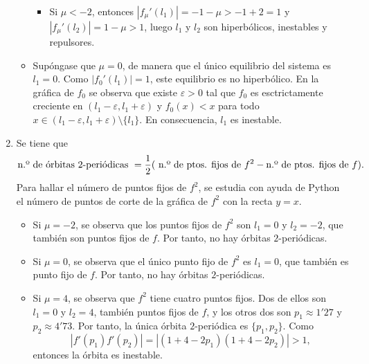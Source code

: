 \documentclass[11pt]{report}
\begin{document}
\begin{solution}
\begin{enumerate}
\begin{itemize}
\begin{itemize}
                \item Si $\mu < -2$, entonces $|f_\mu'(l_1)| = -1-\mu>-1+2=1$ y $|f_\mu'(l_2)| = 1-\mu > 1$, luego $l_1$ y $l_2$ son hiperbólicos, inestables y repulsores.
            \end{itemize}
            \item Supóngase que $\mu = 0$, de manera que el único equilibrio del sistema es $l_1 = 0$. Como $|f_0'(l_1)| = 1$, este equilibrio es no hiperbólico. En la gráfica de $f_0$ se observa que existe $\varepsilon > 0$ tal que $f_0$ es esctrictamente creciente en $(l_1-\varepsilon,l_1+\varepsilon)$ y $f_0(x) < x$ para todo $x \in (l_1-\varepsilon,l_1+\varepsilon)\setminus\{l_1\}$. En consecuencia, $l_1$ es inestable.
        \end{itemize}
        \item Se tiene que
        \[\textup{n.º de órbitas } 2 \textup{-periódicas } = \frac{1}{2}(\textup{ n.º de ptos. fijos de } f^2 - \textup{n.º de ptos. fijos de } f).\]
        Para hallar el número de puntos fijos de $f^2$, se estudia con ayuda de Python el número de puntos de corte de la gráfica de $f^2$ con la recta $y = x$.
        \begin{itemize}
            \item Si $\mu = -2$, se observa que los puntos fijos de $f^2$ son $l_1 = 0$ y $l_2 = -2$, que también son puntos fijos de $f$. Por tanto, no hay órbitas $2$-periódicas.
            \item Si $\mu = 0$, se observa que el único punto fijo de $f^2$ es $l_1 = 0$, que también es punto fijo de $f$. Por tanto, no hay órbitas $2$-periódicas.
            \item Si $\mu = 4$, se observa que $f^2$ tiene cuatro puntos fijos. Dos de ellos son $l_1=0$ y $l_2 = 4$, también puntos fijos de $f$, y los otros dos son $p_1 \approx 1'27$ y $p_2 \approx 4'73$. Por tanto, la única órbita $2$-periódica es $\{p_1,p_2\}$. Como
            \[|f'(p_1)f'(p_2)| = |(1+4-2p_1)(1+4-2p_2)| > 1,\]
            entonces la órbita es inestable.
        \end{itemize}
    \end{enumerate}
\end{solution}
\end{document}
